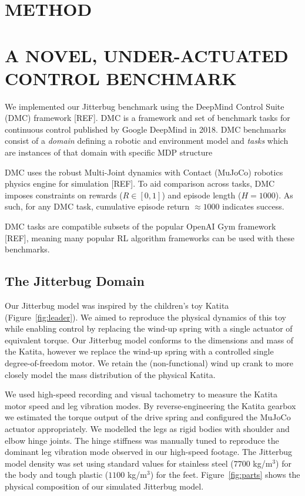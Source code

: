 \documentclass[letterpaper, 10 pt, conference]{ieeeconf}
\begin{document}
\section{METHOD}

\lipsum[1-9]

\section{A NOVEL, UNDER-ACTUATED CONTROL BENCHMARK}

We implemented our Jitterbug benchmark using the DeepMind Control Suite (DMC) framework [REF].
DMC is a framework and set of benchmark tasks for continuous control published by Google DeepMind in 2018.
DMC benchmarks consist of a \emph{domain} defining a robotic and environment model and \emph{tasks} which are instances of that domain with specific MDP structure

DMC uses the robust Multi-Joint dynamics with Contact (MuJoCo) robotics physics engine for simulation [REF].
To aid comparison across tasks, DMC imposes constraints on rewards ($R \in [0, 1]$) and episode length ($H = 1000$).
As such, for any DMC task, cumulative episode return $\approx 1000$ indicates success.

DMC tasks are compatible subsets of the popular OpenAI Gym framework [REF], meaning many popular RL algorithm frameworks can be used with these benchmarks.

\subsection{The Jitterbug Domain}

Our Jitterbug model was inspired by the children's toy Katita (Figure~\ref{fig:leader}).
We aimed to reproduce the physical dynamics of this toy while enabling control by replacing the wind-up spring with a single actuator of equivalent torque.
Our Jitterbug model conforms to the dimensions and mass of the Katita, however we replace the wind-up spring with a controlled single degree-of-freedom motor.
We retain the (non-functional) wind up crank to more closely model the mass distribution of the physical Katita.

We used high-speed recording and visual tachometry to measure the Katita motor speed and leg vibration modes.
By reverse-engineering the Katita gearbox we estimated the torque output of the drive spring and configured the MuJoCo actuator appropriately.
We modelled the legs as rigid bodies with shoulder and elbow hinge joints.
The hinge stiffness was manually tuned to reproduce the dominant leg vibration mode observed in our high-speed footage.
The Jitterbug model density was set using standard values for stainless steel ($7700$ kg/m$^3$) for the body and tough plastic ($1100$ kg/m$^3$) for the feet.
Figure~\ref{fig:parts} shows the physical composition of our simulated Jitterbug model.
\end{document}

